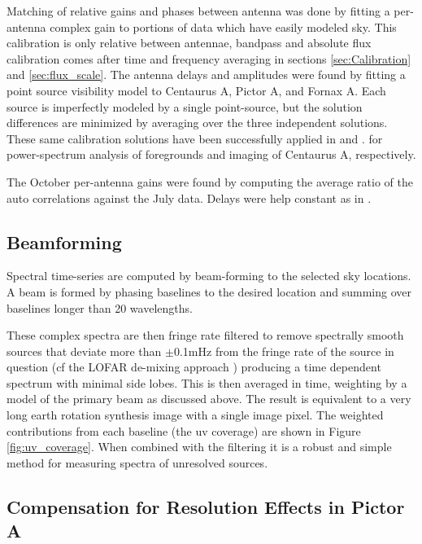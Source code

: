 \documentclass[preprint]{aastex}
\begin{document}
Matching of relative gains and phases between antenna was done by fitting a per-antenna complex gain to portions
of data which have easily modeled sky. 
This calibration is only relative between antennae, bandpass and absolute flux calibration
comes after time and frequency averaging in sections \ref{sec:Calibration} and \ref{sec:flux_scale}.   
The antenna delays and amplitudes were found by fitting a point source visibility
model to Centaurus A, Pictor A, and Fornax A.  Each source is imperfectly
modeled by a single point-source, but the solution differences are minimized by
averaging over the three independent solutions. These same calibration
solutions have been successfully applied in \citet{Pober:2013p9567} and \citet{Stefan:2012p9707}.
for power-spectrum analysis of foregrounds and imaging of Centaurus A, respectively.  

The October per-antenna gains were found by computing the average ratio of the auto correlations
against the July data. Delays were help constant as in \citet{Jacobs:2011p8438}. 



\subsection{Beamforming}

Spectral time-series are computed by beam-forming to the selected sky
locations. A beam is formed by phasing baselines to the desired location and
summing over baselines longer than 20 wavelengths.


 These complex spectra are then fringe rate filtered to remove spectrally
smooth sources that deviate more than $\pm$0.1mHz from the fringe rate of the source in question
 \citep{Parsons:2009p7859} (cf the LOFAR
de-mixing approach \citep{Offringa:2012p9691})  producing a time dependent
spectrum with minimal side lobes. This is then averaged in time,  weighting by a model of the primary
beam as discussed above.
The result is equivalent to
a very long earth rotation synthesis image with a single image pixel. The weighted
contributions from each baseline (the uv coverage) are shown in Figure \ref{fig:uv_coverage}.  When
combined with the filtering it is a robust and simple method for measuring
spectra of unresolved sources. 

\subsection{Compensation for Resolution Effects in Pictor A}
\end{document}
